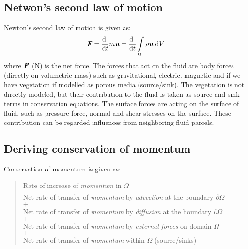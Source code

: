 \subsection{Netwon's second law of motion}
Newton's second law of motion is given as:
\begin{equation}
{\textbf{\textit{F}}} = \frac{\mathrm{d}~}{{\mathrm{d}t}}m{\textbf{\textit{u}}}=\frac{\mathrm{d}~}{{\mathrm{d}t}} \int \limits_\Omega  \rho {\textbf{\textit{u}}}\;\mathrm{d}V
\end{equation}
where $\textbf{\textit{F}}$ (N) is the net force. The forces that act on the fluid are body forces (directly on volumetric mass) such as gravitational, electric, magnetic and if we have vegetation if modelled as porous media (source/sink). The vegetation is not directly modeled, but their contribution to the fluid is taken as source and sink terms in conservation equations. The surface forces are acting on the surface of fluid, such as pressure force, normal and shear stresses on the surface. These contribution can be regarded influences from neighboring fluid parcels.

\subsection{Deriving conservation of momentum}

Conservation of momentum is given as: 
\begin{quote}
	\centering
	Rate of increase of \textit{momentum} in $\Omega$\\
	$=$\\
	Net rate of transfer of \textit{momentum} by \textit{advection} at the boundary $\partial \Omega$\\
	$+$\\
	Net rate of transfer of \textit{momentum} by \textit{diffusion} at the boundary $\partial \Omega$\\
	$+$\\
	Net rate of transfer of \textit{momentum} by \textit{external forces} on domain $\Omega$\\
	$+$\\
	Net rate of transfer of \textit{momentum} within $\Omega$ (source/sinks)
\end{quote}

